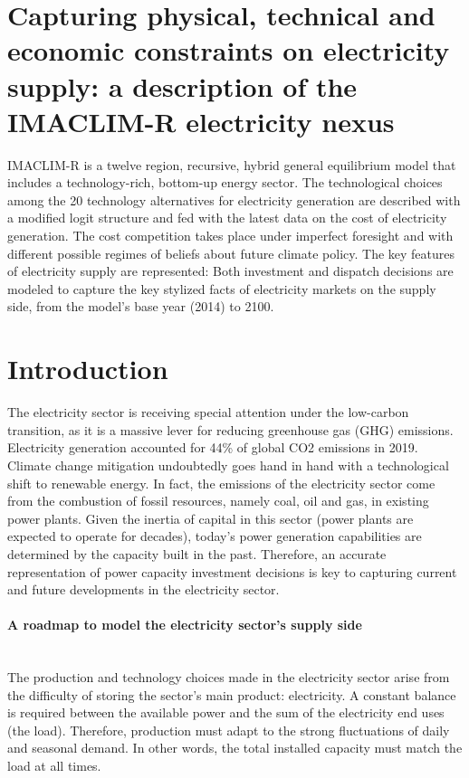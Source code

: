 \section*{Capturing physical, technical and economic constraints on electricity supply: a description of the IMACLIM-R electricity nexus  }

IMACLIM-R is a twelve region, recursive, hybrid general equilibrium model that includes a technology-rich, bottom-up energy sector. The technological choices among the 20 technology alternatives for electricity generation are described with a modified logit structure and fed with the latest data on the cost of electricity generation. The cost competition takes place under imperfect foresight and with different possible regimes of beliefs about future climate policy. The key features of electricity supply are represented:  Both investment and dispatch decisions are modeled to capture the key stylized facts of electricity markets on the supply side, from the model's base year (2014) to 2100.


\section{Introduction}
The electricity sector is receiving special attention under the low-carbon transition, as it is a massive lever for reducing greenhouse gas (GHG) emissions. Electricity generation accounted for 44\% of global CO2 emissions in 2019. Climate change mitigation undoubtedly goes hand in hand with a technological shift to renewable energy. In fact, the emissions of the electricity sector come from the combustion of fossil resources, namely coal, oil and gas, in existing power plants. Given the inertia of capital in this sector (power plants are expected to operate for decades), today's power generation capabilities are determined by the capacity built in the past. Therefore, an accurate representation of power capacity investment decisions is key to capturing current and future developments in the electricity sector.

\paragraph{A roadmap to model the electricity sector's supply side \\~\ }The production and technology choices made in the electricity sector arise from the difficulty of storing the sector's main product: electricity. A constant balance is required between the available power and the sum of the electricity end uses (the load). Therefore, production must adapt to the strong fluctuations of daily and seasonal demand. In other words, the total installed capacity must match the load at all times.

